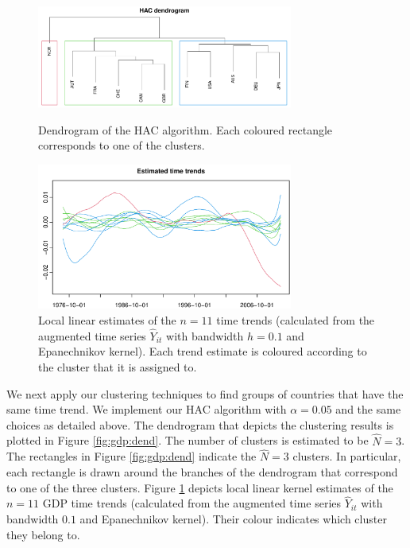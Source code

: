 \documentclass[12pt]{article}
\begin{document}
\begin{figure}[t!]
\begin{center}
\includegraphics[width=0.75\textwidth]{output/plots/gdp/dendrogram}
\caption{Dendrogram of the HAC algorithm. Each coloured rectangle corresponds to one of the clusters.}\label{fig:gdp:dend}

\includegraphics[width=0.75\textwidth]{output/plots/gdp/all_clusters}
\caption{Local linear estimates of the $n=11$ time trends (calculated from the augmented time series $\widehat{Y}_{it}$ with bandwidth $h = 0.1$ and Epanechnikov kernel). Each trend estimate is coloured according to the cluster that it is assigned to. }\label{fig:gdp:all_clusters}
\end{center}
\end{figure}


We next apply our clustering techniques to find groups of countries that have the same time trend. We implement our HAC algorithm with $\alpha = 0.05$ and the same choices as detailed above. The dendrogram that depicts the clustering results is plotted in Figure \ref{fig:gdp:dend}. The number of clusters is estimated to be $\widehat{N} = 3$. The rectangles in Figure \ref{fig:gdp:dend} indicate the $\widehat{N} = 3$ clusters. In particular, each rectangle is drawn around the branches of the dendrogram that correspond to one of the three clusters. Figure \ref{fig:gdp:all_clusters} depicts local linear kernel estimates of the $n=11$ GDP time trends (calculated from the augmented time series $\widehat{Y}_{it}$ with bandwidth $0.1$ and Epanechnikov kernel). Their colour indicates which cluster they belong to. 
\end{document}
